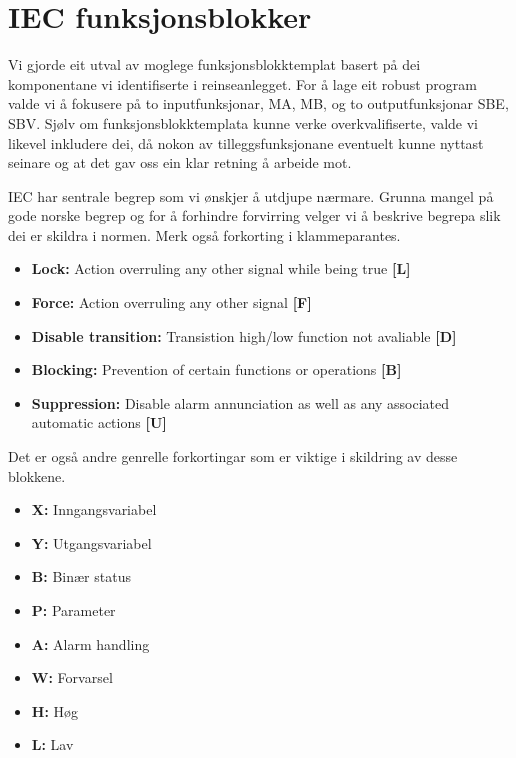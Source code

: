 \section{IEC funksjonsblokker} \label{IEC Seksjon}
\thispagestyle{fancy}

Vi gjorde eit utval av moglege funksjonsblokktemplat basert på dei komponentane vi identifiserte i reinseanlegget.
For å lage eit robust program valde vi å fokusere på to inputfunksjonar, \gls{MA}, \gls{MB}, og to outputfunksjonar \gls{SBE}, \gls{SBV}.
Sjølv om funksjonsblokktemplata kunne verke overkvalifiserte, valde vi likevel inkludere dei, då nokon av tilleggsfunksjonane eventuelt kunne nyttast seinare
og at det gav oss ein klar retning å arbeide mot.

\gls{IEC} har sentrale begrep som vi ønskjer å utdjupe nærmare. Grunna mangel på gode norske begrep
og for å forhindre forvirring velger vi å beskrive begrepa slik dei er skildra i normen. \newline
Merk også forkorting i klammeparantes.

\begin{itemize}
    \item \textbf{Lock:} Action overruling any other signal while being true        \textbf{[L]}
    \item \textbf{Force:} Action overruling any other signal                        \textbf{[F]}
    \item \textbf{Disable transition:} Transistion high/low function not avaliable  \textbf{[D]}
    \item \textbf{Blocking:} Prevention of certain functions or operations          \textbf{[B]}
    \item \textbf{Suppression:} Disable alarm annunciation as well as any associated automatic actions \textbf{[U]}

\end{itemize}

Det er også andre genrelle forkortingar som er viktige i skildring av desse blokkene.

\begin{itemize}
    \item \textbf{X:}   Inngangsvariabel
    \item \textbf{Y:}   Utgangsvariabel
    \item \textbf{B:}   Binær status
    \item \textbf{P:}   Parameter
    \item \textbf{A:}   Alarm handling 
    \item \textbf{W:}   Forvarsel
    \item \textbf{H:}   Høg
    \item \textbf{L:}   Lav
\end{itemize}

